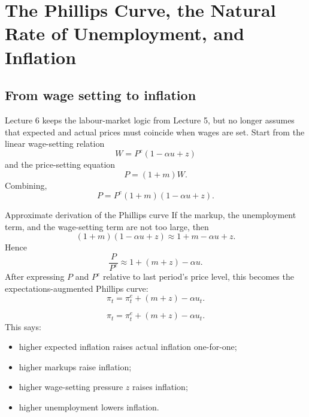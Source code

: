 \documentclass[12pt]{article}
\begin{document}
\newpage



\newpage





\section{The Phillips Curve, the Natural Rate of Unemployment, and Inflation}

\subsection{From wage setting to inflation}

Lecture 6 keeps the labour-market logic from Lecture 5, but no longer assumes that expected and actual prices must coincide when wages are set. Start from the linear wage-setting relation
\[
W=P^e(1-\alpha u+z)
\]
and the price-setting equation
\[
P=(1+m)W.
\]
Combining,
\[
P=P^e(1+m)(1-\alpha u+z).
\]

\begin{theorem}{Approximate derivation of the Phillips curve}{}
If the markup, the unemployment term, and the wage-setting term are not too large, then
\[
(1+m)(1-\alpha u+z)\approx 1+m-\alpha u+z.
\]
Hence
\[
\frac{P}{P^e}\approx 1+(m+z)-\alpha u.
\]
After expressing $P$ and $P^e$ relative to last period's price level, this becomes the expectations-augmented Phillips curve:
\[
\pi_t=\pi_t^e+(m+z)-\alpha u_t.
\]
\end{theorem}

\begin{keyformula}[title={Key Formula: Expectations-augmented Phillips curve}]
\[
\pi_t=\pi_t^e+(m+z)-\alpha u_t.
\]
This says:
\begin{itemize}[leftmargin=1.5em]
\item higher expected inflation raises actual inflation one-for-one;
\item higher markups raise inflation;
\item higher wage-setting pressure $z$ raises inflation;
\item higher unemployment lowers inflation.
\end{itemize}
\end{keyformula}
\end{document}
